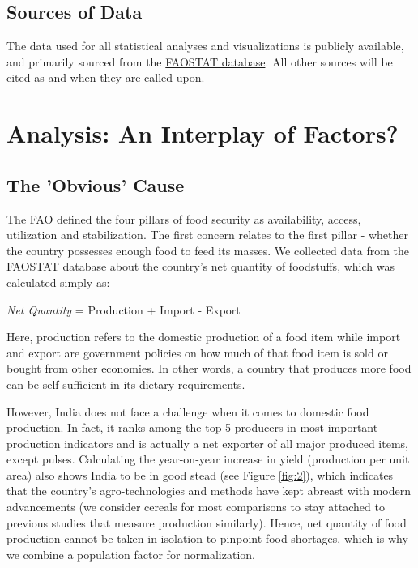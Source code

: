 \documentclass{article}
\begin{document}
\subsection{Sources of Data}

The data used for all statistical analyses and visualizations is publicly available, and primarily sourced from the \href{https://www.fao.org/faostat/en/#data}{FAOSTAT database}. All other sources will be cited as and when they are called upon.

\section{Analysis: An Interplay of Factors?}

\subsection{The 'Obvious' Cause}

The FAO defined the four pillars of food security \cite{pillars} as availability, access, utilization and stabilization. The first concern relates to the first pillar - whether the country possesses enough food to feed its masses. We collected data from the FAOSTAT database about the country's net quantity of foodstuffs, which was calculated simply as:

\begin{center}
    \emph{Net Quantity} = Production + Import - Export
\end{center}

Here, production refers to the domestic production of a food item while import and export are government policies on how much of that food item is sold or bought from other economies. In other words, a country that produces more food can be self-sufficient in its dietary requirements.

However, India does not face a challenge when it comes to domestic food production. In fact, it ranks among the top 5 producers in most important production indicators and is actually a net exporter of all major produced items, except pulses. Calculating the year-on-year increase in yield (production per unit area) also shows India to be in good stead (see Figure \ref{fig:2}), which indicates that the country's agro-technologies and methods have kept abreast with modern advancements (we consider cereals for most comparisons to stay attached to previous studies that measure production similarly). Hence, net quantity of food production cannot be taken in isolation to pinpoint food shortages, which is why we combine a population factor for normalization.
\end{document}
